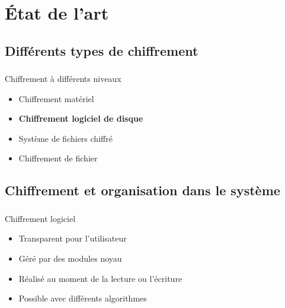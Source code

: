 \section{État de l'art}

\subsection{Différents types de chiffrement}

\begin{frame}
  \frametitle{\insertsubsectionhead}
  \begin{block}{Chiffrement à différents niveaux}
    \begin{itemize}
    \item Chiffrement matériel
    \item \textbf{Chiffrement logiciel de disque}
    \item Système de fichiers chiffré
    \item Chiffrement de fichier
    \end{itemize}
  \end{block}
\end{frame}

\subsection{Chiffrement et organisation dans le système}

\begin{frame}
  \frametitle{\insertsubsectionhead}
  \begin{block}{Chiffrement logiciel}
    \begin{itemize}
    \item Transparent pour l'utilisateur
    \item Géré par des modules noyau
    \item Réalisé au moment de la lecture ou l'écriture
    \item Possible avec différents algorithmes
    \end{itemize}
  \end{block}
\end{frame}

